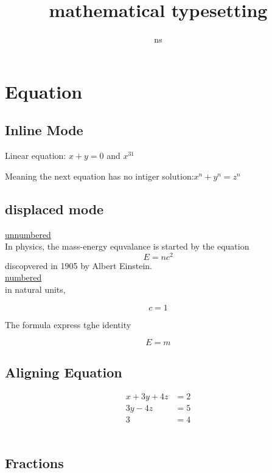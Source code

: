 \documentclass[12pt]{book}
\begin{document}
\title{mathematical typesetting}
\author{ns}
\maketitle

\chapter{Equation}

\section{Inline Mode}
Linear equation: $ x+y=0 $ and $ x^{31} $

Meaning the next equation has no intiger solution:$x^n + y^n =z^n $

\section{displaced mode}
\underline{unnumbered}\\
In physics, the mass-energy equvalance is started by the equation $$ E=nc^2 $$ discopvered in 1905 by Albert Einstein. \\

\underline{numbered}\\

in natural units,

\begin{displaymath}
c=1
\end{displaymath}

The formula express tghe identity

\begin{equation}
E=m
\end{equation}

\section{Aligning Equation}

\begin{align*}
x + 3y + 4z &= 2 \\
3y - 4z &= 5 \\
3 &= 4
\end{align*}\\

\section{Fractions}
\end{document}

